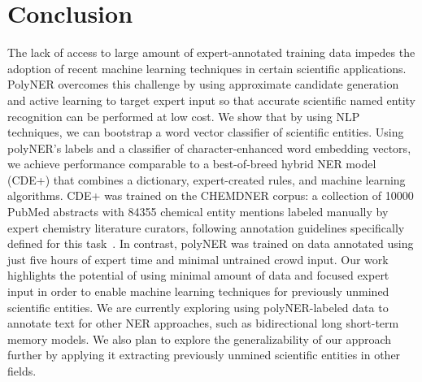 \section{Conclusion}
\label{sect:apner_conclusion}
The lack of access to large amount of expert-annotated training data impedes the adoption of recent machine learning techniques in certain scientific applications.
PolyNER overcomes this challenge by 
using
approximate candidate generation and active learning to target 
expert input so that accurate scientific named entity recognition can be performed at low cost.
We show that by using NLP techniques, we can bootstrap a word vector classifier of scientific entities.
Using polyNER's labels and a classifier of character-enhanced word embedding vectors, we achieve 
performance comparable to a best-of-breed
hybrid NER model (CDE+) that combines a dictionary, expert-created
rules, and machine learning algorithms.
CDE+ was trained on the CHEMDNER corpus:
a collection of \num{10000} PubMed abstracts with \num{84355} chemical entity mentions labeled manually by expert chemistry literature curators, following annotation guidelines specifically defined for this task~\cite{krallinger2015chemdner}. 
In contrast, polyNER was trained on data annotated using just five hours of expert time and minimal untrained crowd input.
Our work highlights the potential of using minimal amount of data and focused expert input in order to enable machine learning techniques for previously unmined scientific entities. 
We are currently exploring using polyNER-labeled data to annotate text for other NER approaches,
such as bidirectional long short-term memory models.
We also plan to explore the generalizability of our approach further by applying it extracting previously unmined scientific entities in other fields.

